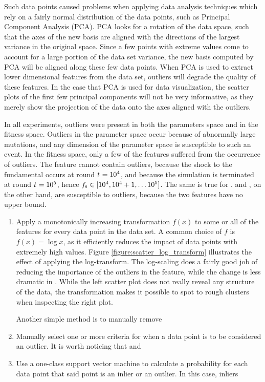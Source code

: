 Such data points caused problems when applying data analysis techniques which rely on a fairly normal distribution of the data points, such as Principal Component Analysis (PCA). PCA looks for a rotation of the data space, such that the axes of the new basis are aligned with the directions of the largest variance in the original space. Since a few points with extreme values come to account for a large portion of the data set variance, the new basis computed by PCA will be aligned along these few data points. When PCA is used to extract lower dimensional features from the data set, outliers will degrade the quality of these features. In the case that PCA is used for data visualization, the scatter plots of the first few principal components will not be very informative, as they merely show the projection of the data onto the axes aligned with the outliers.

In all experiments, outliers were present in both the parameters space and in the fitness space. Outliers in the parameter space occur because of abnormally large mutations, and any dimension of the parameter space is susceptible to such an event. In the fitness space, only a few of the features suffered from the occurrence of outliers. The feature \roundstable cannot contain outliers, because the shock to the fundamental occurs at round $t_{} = 10^4$, and because the simulation is terminated at round $t_{} = 10^5$, hence $f_\text{s} \in [10^4,10^4+1,\hdots 10^5]$. The same is true for \timetoreachnewfundamental. \stdev and \overshoot, on the other hand, are susceptible to outliers, because the two features have no upper bound.


\begin{enumerate}
\item Apply a monotonically increasing transformation $f(x)$ to some or all of the features for every data point in the data set. A common choice of $f$ is $f(x) = \log x$, as it efficiently reduces the impact of data points with extremely high values. Figure \ref{figure:scatter_log_transform} illustrates the effect of applying the log-transform. The log-scaling does a fairly good job of reducing the importance of the outliers in the \stdev feature, while the change is less dramatic in \timetoreachnewfundamental. While the left scatter plot does not really reveal any structure of the data, the transformation makes it possible to spot to rough clusters when inspecting the right plot.

Another simple method is to manually remove 
\item Manually select one or more criteria for when a data point is to be considered an outlier. It is worth noticing that \overshoot and \stdev 
\item Use a one-class support vector machine to calculate a probability for each data point that said point is an inlier or an outlier. In this case, inliers 
\end{enumerate}

